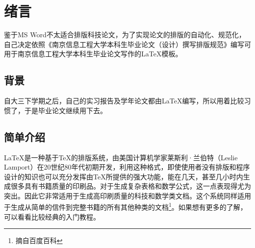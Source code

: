 \section{绪言}
鉴于MS Word不太适合排版科技论文，为了实现论文的排版的自动化、规范化，自己决定依照《南京信息工程大学本科生毕业论文（设计）撰写排版规范》编写可用于南京信息工程大学本科生毕业论文写作的\LaTeX 模板。
\subsection{背景}
自大三下学期之后，自己的实习报告及学年论文都由\LaTeX 编写，所以用着比较习惯了，于是毕业论文继续用下去。

\subsection{简单介绍}
\LaTeX 是一种基于\TeX 的排版系统，由美国计算机学家莱斯利·兰伯特（Leslie Lamport）在20世纪80年代初期开发，利用这种格式，即使使用者没有排版和程序设计的知识也可以充分发挥由TeX所提供的强大功能，能在几天，甚至几小时内生成很多具有书籍质量的印刷品。对于生成复杂表格和数学公式，这一点表现得尤为突出。因此它非常适用于生成高印刷质量的科技和数学类文档。这个系统同样适用于生成从简单的信件到完整书籍的所有其他种类的文档\footnote{摘自百度百科}。如果想有更多的了解，可以看看比较经典的入门教程。
